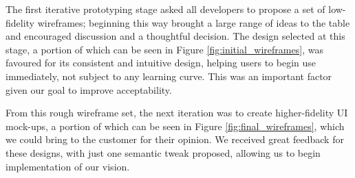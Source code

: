 \documentclass{l3proj}
\begin{document}
The first iterative prototyping stage asked all developers to propose a set of low-fidelity wireframes; beginning this way brought a large range of ideas to the table and encouraged discussion and a thoughtful decision. The design selected at this stage, a portion of which can be seen in Figure \ref{fig:initial_wireframes}, was favoured for its consistent and intuitive design, helping users to begin use immediately, not subject to any learning curve. This was an important factor given our goal to improve acceptability.

From this rough wireframe set, the next iteration was to create higher-fidelity UI mock-ups, a portion of which can be seen in Figure \ref{fig:final_wireframes}, which we could bring to the customer for their opinion. We received great feedback for these designs, with just one semantic tweak proposed, allowing us to begin implementation of our vision. 
\end{document}
